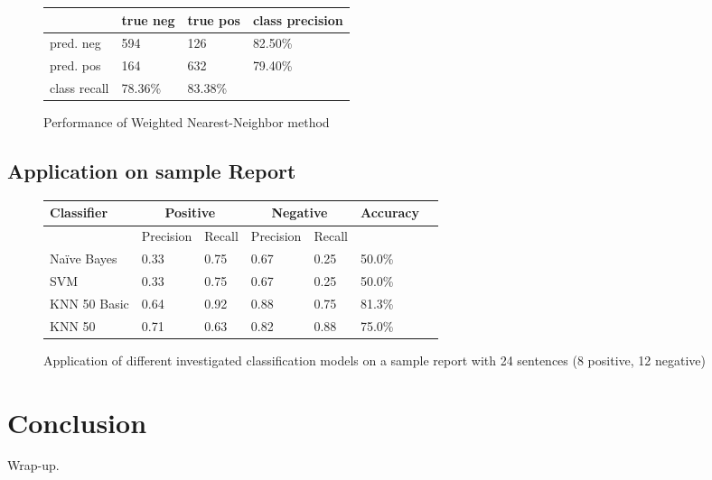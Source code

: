 \documentclass[11pt,titlepage,oneside,openany]{book}
\begin{document}
\begin{figure} [h!]
\centering
\begin{tabular}{ | l | l | l | l | }
\hline
	 & true neg & true pos & class precision \\ \hline
	pred. neg & 594 & 126 & 82.50\% \\ \hline
	pred. pos & 164 & 632 & 79.40\% \\ \hline
	class recall & 78.36\% & 83.38\% &  \\ \hline
\end{tabular}
\caption{Performance of Weighted Nearest-Neighbor method}
\label{fig.wknn}
\end{figure}

\subsection{Application on sample Report}


\begin{figure} [h!]
\centering
\begin{tabular}{ | l | l | l | l | l | l | l | }
\hline
	Classifier & \multicolumn{2}{|c|}{Positive} &  \multicolumn{2}{|c|}{Negative} & Accuracy \\ \hline
	& Precision & Recall & Precision & Recall & \  \\ \hline
	Na\"{i}ve Bayes & 0.33 & 0.75 & 0.67 & 0.25 & 50.0\% \\ \hline
	SVM & 0.33 & 0.75 & 0.67 & 0.25 & 50.0\% \\ \hline
	KNN 50 Basic & 0.64 & 0.92 & 0.88 & 0.75 & 81.3\% \\ \hline
	KNN 50  & 0.71 & 0.63 & 0.82 & 0.88 & 75.0\% \\ \hline
\end{tabular}
\caption{Application of different investigated classification models on a sample report with 24 sentences (8 positive, 12 negative)}
\label{fig.appliedmodel}
\end{figure}


\section{Conclusion}
Wrap-up.



\end{document}

